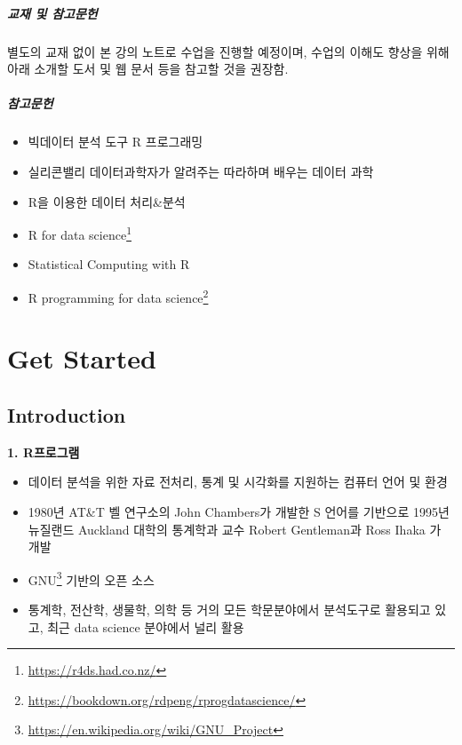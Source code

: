 \documentclass[
  11pt,
]{krantz}
\makeatletter
\providecommand{\tightlist}{%
  \setlength{\itemsep}{0pt}\setlength{\parskip}{0pt}}
\renewcommand{\href}[2]{#2\footnote{\url{#1}}}
\newenvironment{kframe}{%
\medskip{}
\setlength{\fboxsep}{.8em}
 \def\at@end@of@kframe{}%
 \ifinner\ifhmode%
  \def\at@end@of@kframe{\end{minipage}}%
  \begin{minipage}{\columnwidth}%
 \fi\fi%
 \def\FrameCommand##1{\hskip\@totalleftmargin \hskip-\fboxsep
 \colorbox{shadecolor}{##1}\hskip-\fboxsep
     \hskip-\linewidth \hskip-\@totalleftmargin \hskip\columnwidth}%
 \MakeFramed {\advance\hsize-\width
   \@totalleftmargin\z@ \linewidth\hsize
   \@setminipage}}%
 {\par\unskip\endMakeFramed%
 \at@end@of@kframe}
\renewenvironment{quote}{\begin{kframe}}{\end{kframe}}
\makeatother
\begin{document}
\hypertarget{material-course}{%
\subsubsection*{교재 및 참고문헌}\label{material-course}}


\begin{quote}
별도의 교재 없이 본 강의 노트로 수업을 진행할 예정이며, 수업의 이해도 향상을 위해 아래 소개할 도서 및 웹 문서 등을 참고할 것을 권장함.
\end{quote}

\hypertarget{ref-course}{%
\subsubsection*{참고문헌}\label{ref-course}}


\begin{itemize}
\tightlist
\item
  빅데이터 분석 도구 R 프로그래밍 \citep{noman-2012}
\item
  실리콘밸리 데이터과학자가 알려주는 따라하며 배우는 데이터 과학 \citep{kwon-2017}
\item
  R을 이용한 데이터 처리\&분석 \citep{seo-2014}
\item
  \href{https://r4ds.had.co.nz/}{R for data science} \citep{wickham-2016r}
\item
  Statistical Computing with R \citep{rizzo-2019}
\item
  \href{https://bookdown.org/rdpeng/rprogdatascience/}{R programming for data science} \citep{peng-2016}
\end{itemize}

\mainmatter

\footnotesize

\normalsize

\hypertarget{part-get-started}{%
\part{Get Started}\label{part-get-started}}

\hypertarget{intro-chap}{%
\chapter{Introduction}\label{intro-chap}}

\textbf{1. R프로그램}

\begin{itemize}
\tightlist
\item
  데이터 분석을 위한 자료 전처리, 통계 및 시각화를 지원하는 컴퓨터 언어 및 환경
\item
  1980년 AT\&T 벨 연구소의 John Chambers가 개발한 S 언어를 기반으로 1995년 뉴질랜드 Auckland 대학의 통계학과 교수 Robert Gentleman과 Ross Ihaka 가 개발
\item
  \href{https://en.wikipedia.org/wiki/GNU_Project}{GNU} 기반의 오픈 소스
\item
  통계학, 전산학, 생물학, 의학 등 거의 모든 학문분야에서 분석도구로 활용되고 있고, 최근 data science 분야에서 널리 활용
\end{itemize}
\end{document}
